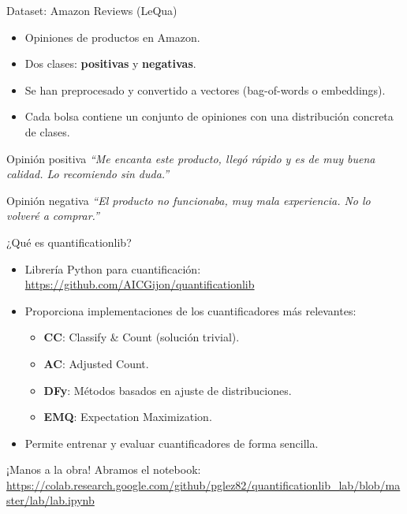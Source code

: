 \documentclass{beamer}
\begin{document}
\begin{frame}{Dataset: Amazon Reviews (LeQua)}
\begin{itemize}
    \item Opiniones de productos en Amazon.
    \item Dos clases: \textbf{positivas} y \textbf{negativas}.
    \item Se han preprocesado y convertido a vectores (bag-of-words o embeddings).
    \item Cada bolsa contiene un conjunto de opiniones con una distribución concreta de clases.
\end{itemize}
\begin{block}{Opinión positiva}
    \small
    \emph{“Me encanta este producto, llegó rápido y es de muy buena calidad. Lo recomiendo sin duda.”}
    \end{block}
    
    \begin{block}{Opinión negativa}
    \small
    \emph{“El producto no funcionaba, muy mala experiencia. No lo volveré a comprar.”}
    \end{block}
\end{frame}


\begin{frame}{¿Qué es quantificationlib?}
\begin{itemize}
    \item Librería Python para cuantificación: \url{https://github.com/AICGijon/quantificationlib}
    \item Proporciona implementaciones de los cuantificadores más relevantes:
    \begin{itemize}
        \item \textbf{CC}: Classify \& Count (solución trivial).
        \item \textbf{AC}: Adjusted Count.
        \item \textbf{DFy}: Métodos basados en ajuste de distribuciones.
        \item \textbf{EMQ}: Expectation Maximization.
    \end{itemize}
    \item Permite entrenar y evaluar cuantificadores de forma sencilla.
\end{itemize}
\end{frame}

\begin{frame}{¡Manos a la obra!}
\centering
\Large
Abramos el notebook: \\
\url{https://colab.research.google.com/github/pglez82/quantificationlib_lab/blob/master/lab/lab.ipynb}
\end{frame}
\end{document}
